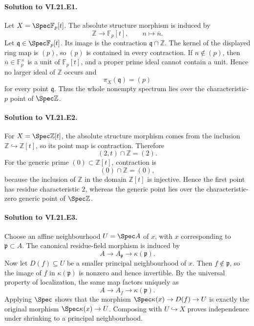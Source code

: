 \paragraph{Solution to VI.21.E1.}
\begin{solution}
Let $X=\Spec\mathbb F_p[t]$.  The absolute structure morphism is induced by
\[
\mathbb Z\longrightarrow \mathbb F_p[t],\qquad n\longmapsto \overline n.
\]
Let $\mathfrak q\in\Spec\mathbb F_p[t]$.  Its image is the contraction
$\mathfrak q\cap\mathbb Z$.  The kernel of the displayed ring map is $(p)$, so $(p)$ is
contained in every contraction.  If $n\notin(p)$, then $\overline n\in\mathbb F_p^\times$ is
a unit of $\mathbb F_p[t]$, and a proper prime ideal cannot contain a unit.  Hence no larger
ideal of $\mathbb Z$ occurs and
\[
\pi_X(\mathfrak q)=(p)
\]
for every point $\mathfrak q$.  Thus the whole nonempty spectrum lies over the characteristic-$p$
point of $\Spec\mathbb Z$.
\end{solution}

\paragraph{Solution to VI.21.E2.}
\begin{solution}
For $X=\Spec\mathbb Z[t]$, the absolute structure morphism comes from the inclusion
$\mathbb Z\hookrightarrow\mathbb Z[t]$, so its point map is contraction.  Therefore
\[
(2,t)\cap\mathbb Z=(2).
\]
For the generic prime $(0)\subset\mathbb Z[t]$, contraction is
\[
(0)\cap\mathbb Z=(0),
\]
because the inclusion of $\mathbb Z$ in the domain $\mathbb Z[t]$ is injective.  Hence the first
point has residue characteristic $2$, whereas the generic point lies over the characteristic-zero
generic point of $\Spec\mathbb Z$.
\end{solution}

\paragraph{Solution to VI.21.E3.}
\begin{solution}
Choose an affine neighbourhood $U=\Spec A$ of $x$, with $x$ corresponding to
$\mathfrak p\subset A$.  The canonical residue-field morphism is induced by
\[
A\longrightarrow A_{\mathfrak p}\longrightarrow\kappa(\mathfrak p).
\]
Now let $D(f)\subseteq U$ be a smaller principal neighbourhood of $x$.  Then $f\notin\mathfrak p$,
so the image of $f$ in $\kappa(\mathfrak p)$ is nonzero and hence invertible.  By the universal
property of localization, the same map factors uniquely as
\[
A\longrightarrow A_f\longrightarrow\kappa(\mathfrak p).
\]
Applying $\Spec$ shows that the morphism $\Spec\kappa(x)\to D(f)\to U$ is exactly the original
morphism $\Spec\kappa(x)\to U$.  Composing with $U\hookrightarrow X$ proves independence under
shrinking to a principal neighbourhood.
\end{solution}

